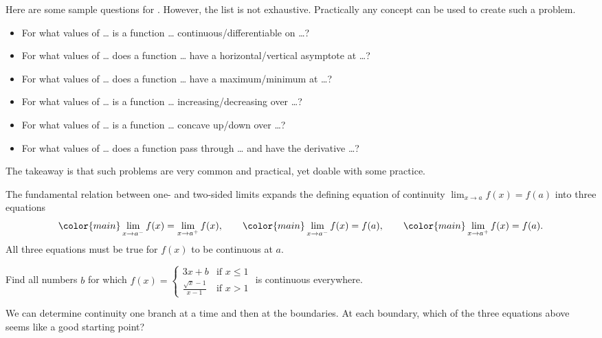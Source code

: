 \documentclass[../main.tex]{subfiles}
\begin{document}
\bigskip
Here are some sample questions for \thiscourse{}. However, the list is not exhaustive. Practically any concept can be used to create such a problem.

\begin{itemize}
  \item For what values of \ldots{} is a function \ldots{} continuous/differentiable on \ldots{}?
  \item For what values of \ldots{} does a function \ldots{} have a horizontal/vertical asymptote at \ldots{}?
  \item For what values of \ldots{} does a function \ldots{} have a maximum/minimum at \ldots{}?
  \item For what values of \ldots{} is a function \ldots{} increasing/decreasing over \ldots{}?
  \item For what values of \ldots{} is a function \ldots{} concave up/down over \ldots{}?
  \item For what values of \ldots{} does a function pass through \ldots{} and have the derivative \ldots{}?
\end{itemize}

\bigskip
The takeaway is that such problems are very common and practical, yet doable with some practice.

\clearpage
The fundamental relation between one- and two-sided limits expands the defining equation of continuity \(\lim_{x \to a} f(x) = f(a)\) into three equations
\[
  {\color{main} \lim_{x \to a^{-}} f(x) = \lim_{x \to a^{+}} f(x)}, \qquad {\color{main} \lim_{x \to a^{-}} f(x) = f(a)}, \qquad {\color{main} \lim_{x \to a^{+}} f(x) = f(a)}.
\]
All three equations must be true for \(f(x)\) to be continuous at \(a\).

\begin{example} \label{eg:find-all-blah-continuity}
  Find all numbers \(b\) for which \(f(x) = \begin{cases} 3x + b &\text{if } x \le 1 \\ \frac{\sqrt{x} - 1}{x - 1} & \text{if } x > 1 \end{cases}\) is continuous everywhere.

  We can determine continuity one branch at a time and then at the boundaries. At each boundary, which of the three equations above seems like a good starting point?

\end{example}
\end{document}
